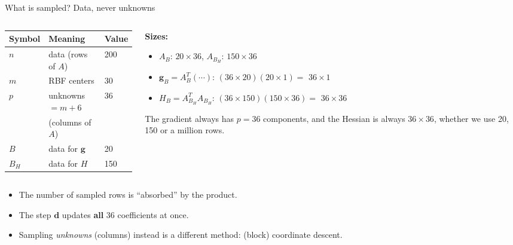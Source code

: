\documentclass[10pt,aspectratio=169]{beamer}
\newcommand{\hl}[1]{\textcolor{accent}{\textbf{#1}}}
\begin{document}
\begin{frame}{What is sampled? Data, never unknowns}
  \begin{columns}[T]
    \begin{column}{0.44\textwidth}
      \small
      \begin{tabular}{lll}
        \toprule
        Symbol & Meaning & Value \\
        \midrule
        $n$ & data (rows of $A$) & 200 \\
        $m$ & RBF centers & 30 \\
        $p$ & unknowns $= m + 6$ & 36 \\
            & (columns of $A$) & \\
        $B$ & data for $\bm{g}$ & 20 \\
        $B_H$ & data for $H$ & 150 \\
        \bottomrule
      \end{tabular}
    \end{column}
    \begin{column}{0.54\textwidth}
      \textbf{Sizes:}
      \begin{itemize}
        \item $A_B$: $20\times36$, \;$A_{B_H}$: $150\times36$
        \item $\bm{g}_B = A_B^T(\cdots)$: \;$(36\times20)(20\times1) = $ \hl{$36\times1$}
        \item $H_B = A_{B_H}^TA_{B_H}$: \;$(36\times150)(150\times36) = $ \hl{$36\times36$}
      \end{itemize}
      \vspace{0.3em}
      The gradient always has $p = 36$ components, and the Hessian is always
      $36\times36$, whether we use 20, 150 or a million rows.
    \end{column}
  \end{columns}
  \vspace{0.8em}
  \begin{itemize}
    \item The number of sampled rows is ``absorbed'' by the product.
    \item The step $\bm{d}$ updates \hl{all} 36 coefficients at once.
    \item Sampling \emph{unknowns} (columns) instead is a different method:
          (block) coordinate descent.
  \end{itemize}
\end{frame}
\end{document}
